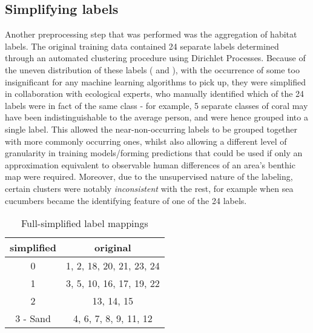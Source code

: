 
\subsection{Simplifying labels}
Another preprocessing step that was performed was the aggregation of habitat labels. The original training data contained 24 separate labels determined through an automated clustering procedure using Dirichlet Processes. Because of the uneven distribution of these labels ( and ), with the occurrence of some too insignificant for any machine learning algorithms to pick up, they were simplified in collaboration with ecological experts, who manually identified which of the 24 labels were in fact of the same class - for example, 5 separate classes of coral may have been indistinguishable to the average person, and were hence grouped into a single label. This allowed the near-non-occurring labels to be grouped together with more commonly occurring ones, whilst also allowing a different level of granularity in training models/forming predictions that could be used if only an approximation equivalent to observable human differences of an area's benthic map were required. Moreover, due to the unsupervised nature of the labeling, certain clusters were notably \textit{inconsistent} with the rest, for example when sea cucumbers became the identifying feature of one of the 24 labels.

\begin{table}[H]
    \centering
    \begin{tabular}{|c| c|}
        \hline
        simplified & original \\\hline
        0 & 1, 2, 18, 20, 21, 23, 24 \\
        1 & 3, 5, 10, 16, 17, 19, 22\\
        2 & 13, 14, 15 \\
        3 - Sand & 4, 6, 7, 8, 9, 11, 12 \\
        \hline
    \end{tabular}
    \caption{Full-simplified label mappings \tiny{}}
    \label{table:labelmappings}
\end{table}

